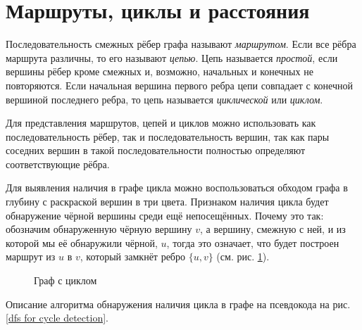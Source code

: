 \section{Маршруты, циклы и расстояния}

Последовательность смежных рёбер графа называют \emph{маршрутом}. Если все 
рёбра маршрута различны, то его называют \emph{цепью}. Цепь называется 
\emph{простой}, если вершины рёбер кроме смежных и, возможно, начальных и 
конечных не повторяются. Если начальная вершина первого ребра цепи совпадает с 
конечной вершиной последнего ребра, то цепь называется \emph{циклической} или 
\emph{циклом}.

Для представления маршрутов, цепей и циклов можно использовать как 
последовательность рёбер, так и последовательность вершин, так как пары 
соседних вершин в такой последовательности полностью определяют соответствующие 
рёбра.

Для выявления наличия в графе цикла можно воспользоваться обходом графа в глубину с раскраской вершин в три цвета. Признаком наличия цикла будет обнаружение чёрной вершины среди ещё непосещённых. Почему это так: обозначим обнаруженную чёрную вершину $v$, а вершину, смежную с ней, и из которой мы её обнаружили чёрной, $u$, тогда это означает, что будет построен маршрут из $u$ в $v$, который замкнёт ребро $\{u,v\}$ (см. рис. \ref{a graph with a cycle}).

\begin{figure}[h]
	\center
	\caption{Граф с циклом}
	\label{a graph with a cycle}
\end{figure}

Описание алгоритма обнаружения наличия цикла в графе на псевдокода на рис. \ref{dfs for cycle detection}.

